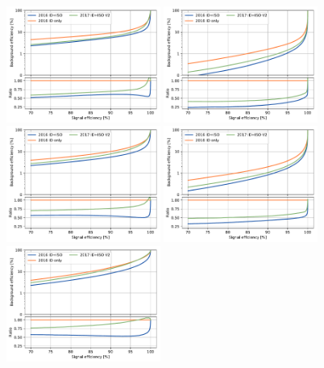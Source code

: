 \begin{figure}[!htb]
   \vspace*{0.3cm}
   \begin{center}
      \includegraphics[width=0.45\textwidth]{Figures/Electrons/2016_EB1_5.pdf}
      \includegraphics[width=0.45\textwidth]{Figures/Electrons/2016_EB1_10.pdf} \\
      \includegraphics[width=0.45\textwidth]{Figures/Electrons/2016_EB2_5.pdf}
      \includegraphics[width=0.45\textwidth]{Figures/Electrons/2016_EB2_10.pdf} \\
      \includegraphics[width=0.45\textwidth]{Figures/Electrons/2016_EE_5.pdf}

\end{center}
\end{figure}
